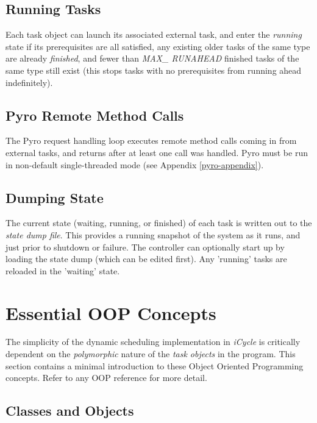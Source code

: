 \documentclass[11pt,a4paper]{article}
\begin{document}
\subsection{Running Tasks}

Each task object can launch its associated external task, and enter the
{\em running} state if its prerequisites are all satisfied, any existing
older tasks of the same type are already {\em finished}, and fewer than
{\em MAX\_ RUNAHEAD} finished tasks of the same type still exist (this
stops tasks with no prerequisites from running ahead indefinitely).

\subsection{Pyro Remote Method Calls}

The Pyro request handling loop executes remote method calls coming in
from external tasks, and returns after at least one call was handled.
Pyro must be run in non-default single-threaded mode (see Appendix
\ref{pyro-appendix}).

\subsection{Dumping State} 

The current state (waiting, running, or finished) of each task is
written out to the {\em state dump file}.  This provides a running
snapshot of the system as it runs, and just prior to shutdown or
failure. The controller can optionally start up by loading the state
dump (which can be edited first). Any 'running' tasks are reloaded in
the 'waiting' state.

\appendix

\section{Essential OOP Concepts}

The simplicity of the dynamic scheduling implementation in {\em iCycle}
is critically dependent on the {\em polymorphic} nature of the {\em task
objects} in the program.  This section contains a minimal introduction
to these Object Oriented Programming concepts.  Refer to any OOP
reference for more detail.

\subsection{Classes and Objects}
\end{document}
